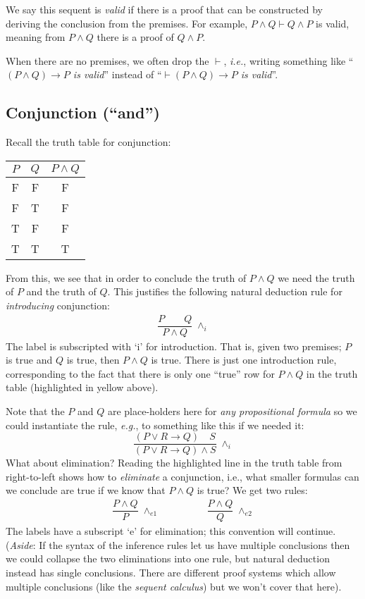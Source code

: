 \documentclass{article}
\theoremstyle{definition}
\newcommand{\ie}{\emph{i.e.}}
\newcommand{\eg}{\emph{e.g.}}
\begin{document}
We say this sequent is \emph{valid} if there is a proof that can be
constructed by deriving the conclusion from the premises. For example,
$P \wedge Q \vdash Q \wedge P$ is valid, meaning from $P \wedge Q$
there is a proof of $Q \wedge P$.

When there are no premises, we often drop the $\vdash$, \ie{},
writing something like ``\emph{$(P \wedge Q) \rightarrow P$ is valid}''
instead of ``\emph{$\vdash (P \wedge Q) \rightarrow P$ is
valid}''.

\subsection{Conjunction (``and'')}

Recall the truth table for conjunction:
%
\begin{center}
\begin{tabular}{cc|c}
  $P$ & $Q$ & $P \wedge Q$ \\ \hline
  F & F & F \\
  F & T & F \\
  T & F & F \\
\rowcolor{yellow}  T & T & T
\end{tabular}
\end{center}
%
From this, we see that in order to conclude the truth of $P \wedge Q$
we need the truth of $P$ and the truth of $Q$. This justifies the
following natural deduction rule for \emph{introducing} conjunction:
%
\begin{align*}
  \dfrac{P \qquad Q}
        {P \wedge Q} \; {\wedge_i}
\end{align*}
%
The label is subscripted with `i' for introduction.
That is, given two premises; $P$ is true and $Q$ is true, then
$P \wedge Q$ is true. There is just one introduction rule,
corresponding to the fact that there is only one ``true'' row
for $P \wedge Q$ in the truth table (highlighted in yellow above).

Note that the $P$ and $Q$ are place-holders here for \emph{any
  propositional formula} so we could instantiate the rule, \eg{},
to something like this if we needed it:
%
\begin{equation*}
\dfrac{(P \vee R \rightarrow Q) \quad S}
      {(P \vee R \rightarrow Q) \wedge S} \; {\wedge_i}
\end{equation*}
%
What about elimination?
Reading the highlighted line in the truth table from right-to-left shows how to
\emph{eliminate} a conjunction, i.e., what smaller formulas
can we conclude are true if we know that $P \wedge Q$ is true? We get
two rules:
%
\begin{align*}
  \dfrac{P \wedge Q}
        {P} \; {\wedge_{e1}}
  \qquad & \qquad
      \dfrac{P \wedge Q}
        {Q} \; {\wedge_{e2}}
\end{align*}
%
The labels have a subscript `e' for elimination; this convention will
continue.  (\emph{Aside}: If the syntax of the inference rules let us
have multiple conclusions then we could collapse the two eliminations
into one rule, but natural deduction instead has single
conclusions. There are different proof systems which allow
multiple conclusions (like the \emph{sequent calculus}) but we won't cover that here).
\end{document}
